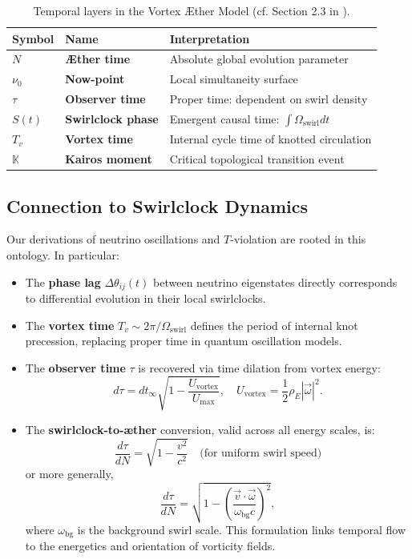 \documentclass[preprint]{revtex4-2}
\begin{document}
\begin{table}[H]
\centering
\renewcommand{\arraystretch}{1.1}
\begin{tabular}{|l|l|l|}
\hline
\textbf{Symbol} & \textbf{Name} & \textbf{Interpretation} \\
\hline
$N$ & \textbf{Æther time} & Absolute global evolution parameter \\
$\nu_0$ & \textbf{Now-point} & Local simultaneity surface \\
$\tau$ & \textbf{Observer time} & Proper time: dependent on swirl density \\
$S(t)$ & \textbf{Swirlclock phase} & Emergent causal time: $\int \Omega_\text{swirl} dt$ \\
$T_v$ & \textbf{Vortex time} & Internal cycle time of knotted circulation \\
$\mathbb{K}$ & \textbf{Kairos moment} & Critical topological transition event \\
\hline
\end{tabular}
\caption{Temporal layers in the Vortex Æther Model (cf. Section 2.3 in \cite{iskandarani2025vam2}).}
\end{table}

\subsection*{Connection to Swirlclock Dynamics}

Our derivations of neutrino oscillations and $T$-violation are rooted in this ontology. In particular:

\begin{itemize}
    \item The \textbf{phase lag} $\Delta \theta_{ij}(t)$ between neutrino eigenstates directly corresponds to differential evolution in their local swirlclocks.
    \item The \textbf{vortex time} $T_v \sim 2\pi / \Omega_{\text{swirl}}$ defines the period of internal knot precession, replacing proper time in quantum oscillation models.
    \item The \textbf{observer time} $\tau$ is recovered via time dilation from vortex energy:
    \[
    d\tau = dt_\infty \sqrt{1 - \frac{U_{\text{vortex}}}{U_{\text{max}}}}, \quad
    U_{\text{vortex}} = \frac{1}{2} \rho_{\scriptscriptstyle\boldsymbol\!E}|\vec{\omega}|^2.
    \]
    \item The \textbf{swirlclock-to-æther} conversion, valid across all energy scales, is:
    \[
    \frac{d\tau}{dN} = \sqrt{1 - \frac{v^2}{c^2}} \quad \text{(for uniform swirl speed)}
    \]
    or more generally,
    \[
    \frac{d\tau}{dN} = \sqrt{1 - \left( \frac{\vec{v} \cdot \vec{\omega}}{\omega_{\text{bg}} c} \right)^2},
    \]
    where $\omega_{\text{bg}}$ is the background swirl scale. This formulation links temporal flow to the energetics and orientation of vorticity fields.
\end{itemize}
\end{document}

